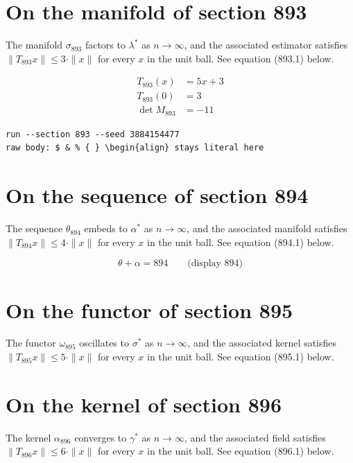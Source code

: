 \documentclass{article}
\begin{document}
\section{On the manifold of section 893}
The manifold $\sigma_{893}$ factors to $\lambda^{*}$ as $n \to \infty$,
and the associated estimator satisfies $\|T_{893} x\| \leq 3 \cdot \|x\|$
for every $x$ in the unit ball. See equation (893.1) below.

\begin{align}
T_{893}(x) &= 5 x + 3 \\
T_{893}(0) &= 3 \\
\det M_{893} &= -11
\end{align}

\begin{verbatim}
run --section 893 --seed 3884154477
raw body: $ & % { } \begin{align} stays literal here
\end{verbatim}

\section{On the sequence of section 894}
The sequence $\theta_{894}$ embeds to $\alpha^{*}$ as $n \to \infty$,
and the associated manifold satisfies $\|T_{894} x\| \leq 4 \cdot \|x\|$
for every $x$ in the unit ball. See equation (894.1) below.

$$
\theta + \alpha = 894 \qquad \text{(display 894)}
$$

\section{On the functor of section 895}
The functor $\omega_{895}$ oscillates to $\sigma^{*}$ as $n \to \infty$,
and the associated kernel satisfies $\|T_{895} x\| \leq 5 \cdot \|x\|$
for every $x$ in the unit ball. See equation (895.1) below.

\section{On the kernel of section 896}
The kernel $\alpha_{896}$ converges to $\gamma^{*}$ as $n \to \infty$,
and the associated field satisfies $\|T_{896} x\| \leq 6 \cdot \|x\|$
for every $x$ in the unit ball. See equation (896.1) below.
\end{document}
